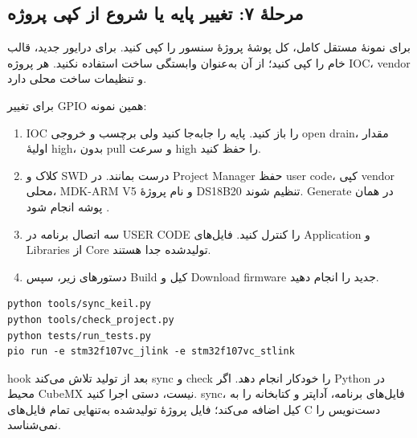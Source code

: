 \subsection{مرحلهٔ ۷: تغییر پایه یا شروع از کپی پروژه}
برای نمونهٔ مستقل کامل، کل پوشهٔ پروژهٔ سنسور را کپی کنید. برای درایور جدید، قالب خام را کپی کنید؛ از آن به‌عنوان وابستگی ساخت استفاده نکنید. هر پروژه IOC، vendor و تنظیمات ساخت محلی دارد.

برای تغییر GPIO همین نمونه:
\begin{enumerate}
\item IOC را باز کنید. پایه را جابه‌جا کنید ولی برچسب
و خروجی open drain، مقدار اولیهٔ high، بدون pull و سرعت high را حفظ کنید.
\item کلاک و SWD درست بمانند. در Project Manager حفظ user code، کپی vendor محلی، MDK-ARM V5 و نام پروژهٔ DS18B20 تنظیم شوند. Generate در همان پوشه انجام شود
\cite{cubemx}.
\item سه اتصال برنامه در USER CODE را کنترل کنید. فایل‌های Application و Libraries از Core تولیدشده جدا هستند.
\item دستورهای زیر، سپس Build کیل و Download firmware جدید را انجام دهید.
\end{enumerate}
\begin{LTR}
\begin{lstlisting}[language={},numbers=none]
python tools/sync_keil.py
python tools/check_project.py
python tests/run_tests.py
pio run -e stm32f107vc_jlink -e stm32f107vc_stlink
\end{lstlisting}
\end{LTR}
hook بعد از تولید تلاش می‌کند sync و check را خودکار انجام دهد. اگر Python در محیط CubeMX نیست، دستی اجرا کنید. sync، فایل‌های برنامه، آداپتر و کتابخانه را به کیل اضافه می‌کند؛ فایل پروژهٔ تولیدشده به‌تنهایی تمام فایل‌های C دست‌نویس را نمی‌شناسد.


